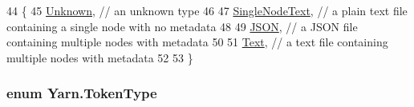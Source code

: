 \begin{DoxyCode}
44     \{
45         \hyperlink{a00051_ad7ebb46e7309ead8767383a672b3272fa88183b946cc5f0e8c96b2e66e1c74a7e}{Unknown}, \textcolor{comment}{// an unknown type}
46 
47         \hyperlink{a00051_ad7ebb46e7309ead8767383a672b3272faceeb33da53902872b63956f8df786cd8}{SingleNodeText}, \textcolor{comment}{// a plain text file containing a single node with no metadata}
48 
49         \hyperlink{a00051_ad7ebb46e7309ead8767383a672b3272fa0ecd11c1d7a287401d148a23bbd7a2f8}{JSON}, \textcolor{comment}{// a JSON file containing multiple nodes with metadata}
50 
51         \hyperlink{a00051_a301aa7c866593a5b625a8fc158bbeacea9dffbf69ffba8bc38bc4e01abf4b1675}{Text}, \textcolor{comment}{//  a text file containing multiple nodes with metadata}
52 
53     \}
\end{DoxyCode}
\hypertarget{a00051_a301aa7c866593a5b625a8fc158bbeace}{
\subsubsection[{Token\-Type}]{\setlength{\rightskip}{0pt plus 5cm}enum {\bf Yarn.\-Token\-Type}\hspace{0.3cm}{\ttfamily [package]}}}\label{a00051_a301aa7c866593a5b625a8fc158bbeace}
